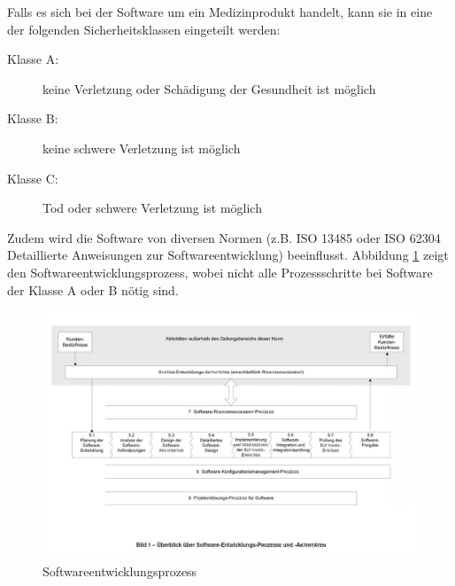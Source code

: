 Falls es sich bei der Software um ein Medizinprodukt handelt, kann sie in eine der folgenden Sicherheitsklassen eingeteilt werden:
\begin{description}
	\item[Klasse A:] keine Verletzung oder Schädigung der Gesundheit ist möglich
	\item[Klasse B:] keine schwere Verletzung ist möglich
	\item[Klasse C:] Tod oder schwere Verletzung ist möglich
\end{description}
Zudem wird die Software von diversen Normen (z.B. ISO 13485 oder ISO 62304 Detaillierte Anweisungen zur Softwareentwicklung) beeinflusst. Abbildung \ref{fig:software} zeigt den Softwareentwicklungsprozess, wobei nicht alle Prozessschritte bei Software der Klasse A oder B nötig sind.

\begin{figure}
\centering
\includegraphics[width=0.7\linewidth]{fig/software}
\caption{Softwareentwicklungsprozess}
\label{fig:software}
\end{figure}
